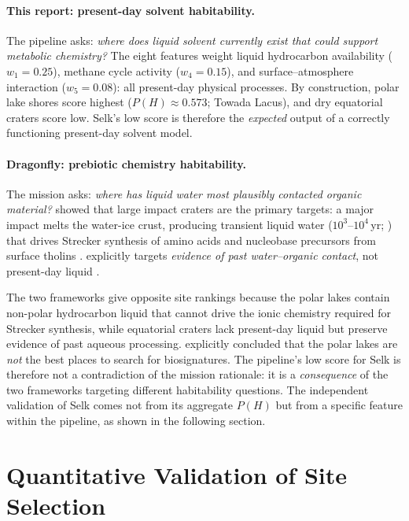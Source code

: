 \paragraph{This report: present-day solvent habitability.}
The pipeline asks: \textit{where does liquid solvent currently exist
that could support metabolic chemistry?}  The eight features weight
liquid hydrocarbon availability ($w_1 = 0.25$), methane cycle activity
($w_4 = 0.15$), and surface--atmosphere interaction ($w_5 = 0.08$):
all present-day physical processes.  By construction, polar lake shores
score highest ($P(H) \approx 0.573$; Towada Lacus), and dry equatorial
craters score low.  Selk's low score is therefore the \textit{expected}
output of a correctly functioning present-day solvent model.

\paragraph{Dragonfly: prebiotic chemistry habitability.}
The mission asks: \textit{where has liquid water most plausibly
contacted organic material?}  \citet{Neish2018} showed that large
impact craters are the primary targets: a major impact melts the
water-ice crust, producing transient liquid water ($10^3$--$10^4$\,yr;
\citealt{OBrien2005}) that drives Strecker synthesis of
amino acids and nucleobase precursors from surface tholins
\citep{Neish2010}.  \dragonfly{} explicitly targets
\textit{evidence of past water--organic contact}, not present-day
liquid \citep{Lorenz2021Landing}.

The two frameworks give opposite site rankings because the polar lakes
contain non-polar hydrocarbon liquid that cannot drive the ionic
chemistry required for Strecker synthesis, while equatorial craters
lack present-day liquid but preserve evidence of past aqueous
processing.  \citet{Neish2018} explicitly concluded that the polar
lakes are \textit{not} the best places to search for biosignatures.
The pipeline's low score for Selk is therefore not a contradiction of
the mission rationale: it is a \textit{consequence} of the two
frameworks targeting different habitability questions.  The independent
validation of Selk comes not from its aggregate $P(H)$ but from a
specific feature within the pipeline, as shown in the following section.

\section{Quantitative Validation of Site Selection}
\label{sec:dragonfly_quant}

